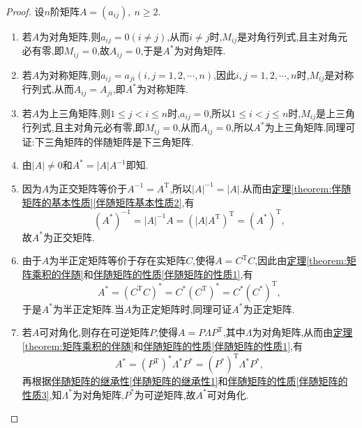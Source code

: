 \documentclass[../../main.tex]{subfiles}%
\begin{document}
\begin{proof}
设\(n\)阶矩阵\(A = (a_{ij}),\ n \geqslant  2\).
\begin{enumerate}
\item 若\(A\)为对角矩阵,则\(a_{ij} = 0 (i \neq j)\),从而\(i \neq j\)时,\(M_{ij}\)是对角行列式,且主对角元必有零,即\(M_{ij} = 0\),故\(A_{ij} = 0\),于是\(A^*\)为对角矩阵.

\item 若\(A\)为对称矩阵,则\(a_{ij} = a_{ji} (i, j = 1, 2, \cdots, n)\),因此\(i, j = 1, 2, \cdots, n\)时,\(M_{ij}\)是对称行列式,从而\(A_{ij} = A_{ji}\),即\(A^*\)为对称矩阵.

\item 若\(A\)为上三角矩阵,则\(1 \leqslant  j < i \leqslant  n\)时,\(a_{ij} = 0\),所以\(1 \leqslant  i < j \leqslant  n\)时,\(M_{ij}\)是上三角行列式,且主对角元必有零,即\(M_{ij} = 0\),从而\(A_{ij} = 0\),所以\(A^*\)为上三角矩阵.同理可证:下三角矩阵的伴随矩阵是下三角矩阵.

\item 由\(\vert A \vert \neq 0\)和\(A^* = \vert A \vert A^{-1}\)即知.

\item 因为\(A\)为正交矩阵等价于\(A^{-1} = A^{\mathrm{T}}\),所以\(\vert A \vert^{-1} = \vert A \vert\).从而由\hyperref[伴随矩阵基本性质2]{定理\ref{theorem:伴随矩阵的基本性质}\ref{伴随矩阵基本性质2}},有
\[
(A^*)^{-1} = \vert A \vert^{-1} A = (\vert A \vert A^{\mathrm{T}})^{\mathrm{T}} = (A^*)^{\mathrm{T}},
\]
故\(A^*\)为正交矩阵.

\item 由于\(A\)为半正定矩阵等价于存在实矩阵\(C\),使得\(A = C^{\mathrm{T}}C\),因此由\hyperref[theorem:矩阵乘积的伴随]{定理\ref{theorem:矩阵乘积的伴随}}和\hyperref[伴随矩阵的性质1]{伴随矩阵的性质\ref{伴随矩阵的性质1}},有
\[
A^* = (C^{\mathrm{T}}C)^* = C^*(C^{\mathrm{T}})^* = C^*(C^*)^{\mathrm{T}},
\]
于是\(A^*\)为半正定矩阵.当\(A\)为正定矩阵时,同理可证\(A^*\)为正定矩阵.

\item 若\(A\)可对角化,则存在可逆矩阵\(P\),使得\(A = P\Lambda P^{\mathrm{T}}\),其中\(\Lambda\)为对角矩阵,从而由\hyperref[theorem:矩阵乘积的伴随]{定理\ref{theorem:矩阵乘积的伴随}}和\hyperref[伴随矩阵的性质1]{伴随矩阵的性质\ref{伴随矩阵的性质1}},有
\[
A^* = (P^{\mathrm{T}})^*\Lambda^*P^* = (P^*)^{\mathrm{T}}\Lambda^*P^*,
\]
再根据\hyperref[伴随矩阵的继承性1]{伴随矩阵的继承性\ref{伴随矩阵的继承性1}}和\hyperref[伴随矩阵的性质3]{伴随矩阵的性质\ref{伴随矩阵的性质3}},知\(\Lambda^*\)为对角矩阵,\(P^*\)为可逆矩阵,故\(A^*\)可对角化.
\end{enumerate}
\end{proof}
\end{document}
